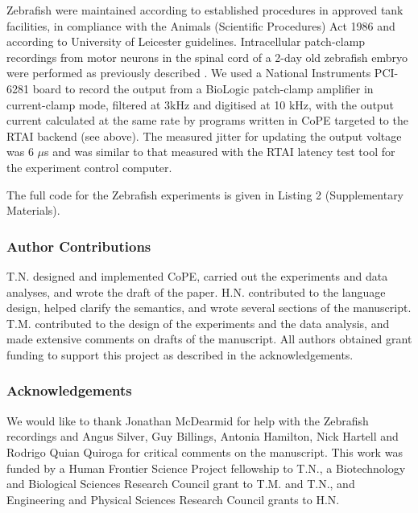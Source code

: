 Zebrafish were maintained according to established procedures
\citep{Westerfield1994} in approved tank facilities, in compliance
with the Animals (Scientific Procedures) Act 1986 and according to
University of Leicester guidelines. Intracellular patch-clamp
recordings from motor neurons in the spinal cord of a 2-day old
zebrafish embryo were performed as previously described
\citep{McDearmid2006}. We used a National Instruments PCI-6281 board
to record the output from a BioLogic patch-clamp amplifier in
current-clamp mode, filtered at 3kHz and digitised at 10 kHz, with the
output current calculated at the same rate by programs written in
CoPE targeted to the RTAI backend (see
above). The measured jitter for updating the output voltage was 6
$\mu$s and was similar to that measured with the RTAI latency test
tool for the experiment control computer.

The full code for the Zebrafish experiments is given in Listing 2
(Supplementary Materials).

\subsubsection*{Author Contributions}  

T.N. designed and implemented CoPE, carried out the experiments and
data analyses, and wrote the draft of the paper. H.N. contributed to
the language design, helped clarify the semantics, and wrote several
sections of the manuscript. T.M. contributed to the design of the
experiments and the data analysis, and made extensive comments on
drafts of the manuscript. All authors obtained grant funding to
support this project as described in the acknowledgements.

\subsubsection*{Acknowledgements}  

We would like to thank Jonathan McDearmid for help with the Zebrafish
recordings and Angus Silver, Guy Billings, Antonia Hamilton, Nick
Hartell and Rodrigo Quian Quiroga for critical comments on the
manuscript. This work was funded by a Human Frontier Science Project
fellowship to T.N., a Biotechnology and Biological Sciences Research
Council grant to T.M. and T.N., and Engineering and Physical Sciences Research
Council grants to H.N.



